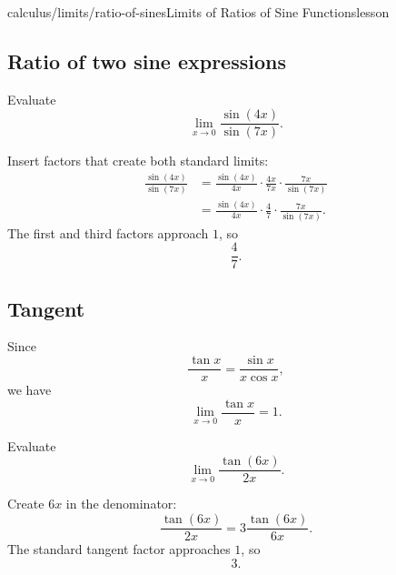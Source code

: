 \begin{webpage}{calculus/limits/ratio-of-sines}{Limits of Ratios of Sine Functions}{lesson}
\subsection{Ratio of two sine expressions}

\begin{bgexample}[title={Sine over sine}]
Evaluate
\[
  \lim_{x\to0}\frac{\sin(4x)}{\sin(7x)}.
\]

\begin{bgsolution}
Insert factors that create both standard limits:
\begin{align*}
\frac{\sin(4x)}{\sin(7x)}
&=\frac{\sin(4x)}{4x}
  \cdot\frac{4x}{7x}
  \cdot\frac{7x}{\sin(7x)}\\
&=\frac{\sin(4x)}{4x}
  \cdot\frac47
  \cdot\frac{7x}{\sin(7x)}.
\end{align*}
The first and third factors approach \(1\), so
\[
  \boxed{\frac47}.
\]
\end{bgsolution}
\end{bgexample}

\subsection{Tangent}

Since
\[
  \frac{\tan x}{x}
  =\frac{\sin x}{x\cos x},
\]
we have
\[
  \boxed{\lim_{x\to0}\frac{\tan x}{x}=1}.
\]

\begin{bgexample}[title={A tangent limit}]
Evaluate
\[
  \lim_{x\to0}\frac{\tan(6x)}{2x}.
\]

\begin{bgsolution}
Create \(6x\) in the denominator:
\[
  \frac{\tan(6x)}{2x}
  =3\frac{\tan(6x)}{6x}.
\]
The standard tangent factor approaches \(1\), so
\[
  \boxed{3}.
\]
\end{bgsolution}
\end{bgexample}
\end{webpage}

